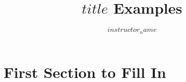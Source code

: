 \documentclass{article}
\begin{document}
\title{$title$ Examples}
\author{$instructor_name$}
\date{}
\maketitle

\section{First Section to Fill In}

\lipsum[1]
\end{document}
